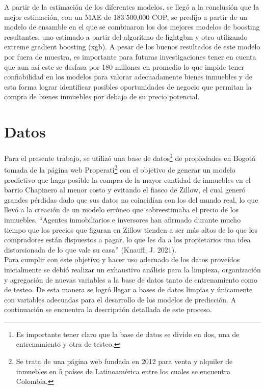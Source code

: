 \documentclass[10pt]{article}
\begin{document}
A partir de la estimación de los diferentes modelos, se llegó a la conclusión que la mejor estimación, con un MAE de 183’500,000 COP, se predijo a partir de un modelo de ensamble en el que se combinaron los dos mejores modelos de boosting resultantes, uno estimado a partir del algoritmo de lightgbm y otro utilizando extreme gradient boosting (xgb). A pesar de los buenos resultados de este modelo por fuera de muestra, es importante para futuras investigaciones tener en cuenta que aun así este se desfasa por 180 millones en promedio lo que impide tener confiabilidad en los modelos para valorar adecuadamente bienes inmuebles y de esta forma lograr identificar posibles oportunidades de negocio que permitan la compra de bienes inmuebles por debajo de su precio potencial.  

\section{Datos}

Para el presente trabajo, se utilizó una base de datos\footnote{Es importante tener claro que la base de datos se divide en dos, una de entrenamiento y otra de testeo.}  de propiedades en Bogotá tomada de la página web Properati\footnote{Se trata de una página web fundada en 2012 para venta y alquiler de inmuebles en 5 países de Latinoamérica entre los cuales se encuentra Colombia.}  con el objetivo de generar un modelo predictivo que haga posible la compra de la mayor cantidad de inmuebles en el barrio Chapinero al menor costo y evitando el fiasco de Zillow, el cual generó grandes pérdidas dado que sus datos no coincidían con los del mundo real, lo que llevó a la creación de un modelo erróneo que sobreestimaba el precio de los inmuebles. “Agentes inmobiliarios e inversores han afirmado durante mucho tiempo que los precios que figuran en Zillow tienden a ser más altos de lo que los compradores están dispuestos a pagar, lo que les da a los propietarios una idea distorsionada de lo que vale su casa” (Knauff, J. 2021). \\

Para cumplir con este objetivo y hacer uso adecuado de los datos proveídos inicialmente se debió realizar un exhaustivo análisis para la limpieza, organización y agregación de nuevas variables a la base de datos tanto de entrenamiento como de testeo. De esta manera se logró llegar a bases de datos limpias y únicamente con variables adecuadas para el desarrollo de los modelos de predicción. A continuación se encuentra la descripción detallada de este proceso. \\
\end{document}
